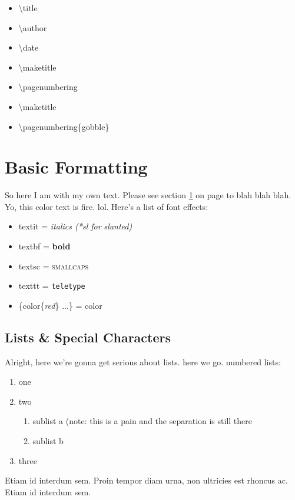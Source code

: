 \begin{itemize}
\itemsep=-0.5em
\item \textbackslash title
\item \textbackslash author
\item \textbackslash date
\item \textbackslash maketitle
\item \textbackslash pagenumbering
\item \textbackslash maketitle
\item \textbackslash pagenumbering\{gobble\}

\end{itemize}



\newpage
\onecolumn

\section{Basic Formatting} \label{Basic Formatting}
So here I am with my own text. Please see section \ref{Basic Formatting} on page \pageref{Basic Formatting} to blah blah blah. Yo, this color text is {\color{red}fire}. lol. Here's a list of font effects:
\begin{itemize}
\itemsep=-0.5em %
\item textit = \textit{italics (*sl for \textsl{slanted})}
\item textbf = \textbf{bold}
\item textsc = \textsc{smallcaps}
\item texttt = \texttt{teletype}
\item \{color\{\textit{red}\} ...\} = {\color{red} color}
\end{itemize}

\subsection{Lists \& Special Characters}
Alright, here we're gonna get serious about lists. here we go. numbered lists:
\begin{enumerate}
\itemsep=-0.5em %
\item one
\item two
\begin{enumerate}
\item sublist a (note: this is a pain and the separation is still there
\item sublist b
\end{enumerate}
\item three
\end{enumerate}
Etiam id interdum sem. Proin tempor diam urna, non ultricies est rhoncus ac. Etiam id interdum sem.

